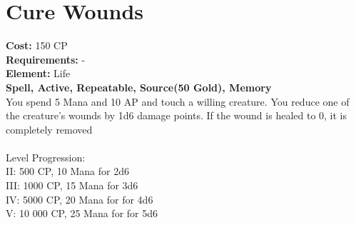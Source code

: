 \section{Cure Wounds}
\textbf{Cost:} 150 CP\\
\textbf{Requirements:} -\\
\textbf{Element:} Life\\
\textbf{Spell, Active, Repeatable, Source(50 Gold), Memory}\\
You spend 5 Mana and 10 AP and touch a willing creature. You reduce one of the creature's wounds by 1d6 damage points. If the wound is healed to 0, it is completely removed\\
\\
Level Progression:\\
II: 500 CP, 10 Mana for 2d6\\
III: 1000 CP, 15 Mana for 3d6\\
IV: 5000 CP, 20 Mana for for 4d6\\
V: 10 000 CP, 25 Mana for for 5d6\\